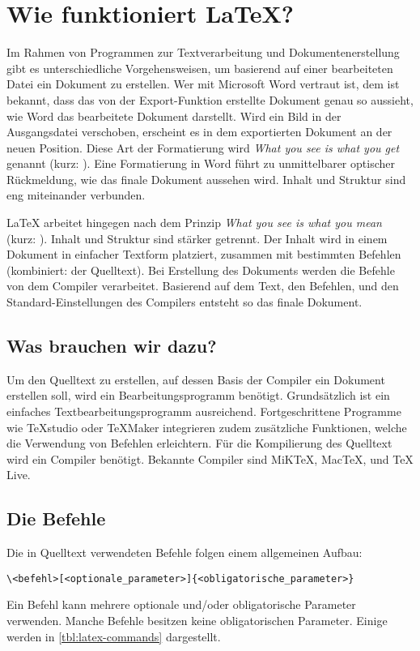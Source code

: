 \section{Wie funktioniert \LaTeX?}
\label{sec:wie_funktioniert_latex_}

Im Rahmen von Programmen zur Textverarbeitung und Dokumentenerstellung gibt es unterschiedliche Vorgehensweisen, um basierend auf einer bearbeiteten Datei ein Dokument zu erstellen. Wer mit Microsoft Word vertraut ist, dem ist bekannt, dass das von der Export-Funktion erstellte Dokument genau so aussieht, wie Word das bearbeitete Dokument darstellt. Wird ein Bild in der Ausgangsdatei verschoben, erscheint es in dem exportierten Dokument an der neuen Position. Diese Art der Formatierung wird \emph{What you see is what you get} genannt (kurz: ). Eine Formatierung in Word führt zu unmittelbarer optischer Rückmeldung, wie das finale Dokument aussehen wird. Inhalt und Struktur sind eng miteinander verbunden.

\LaTeX{} arbeitet hingegen nach dem Prinzip \emph{What you see is what you mean} (kurz: ). Inhalt und Struktur sind stärker getrennt. Der Inhalt wird in einem Dokument in einfacher Textform platziert, zusammen mit bestimmten Befehlen (kombiniert: der Quelltext). Bei Erstellung des Dokuments werden die Befehle von dem Compiler verarbeitet. Basierend auf dem Text, den Befehlen, und den Standard-Einstellungen des Compilers entsteht so das finale Dokument. 

\subsection{Was brauchen wir dazu?}
\label{sub:was_brauchen_wir_dazu}
Um den Quelltext zu erstellen, auf dessen Basis der Compiler ein Dokument erstellen soll, wird ein Bearbeitungsprogramm benötigt. Grundsätzlich ist ein einfaches Textbearbeitungsprogramm ausreichend. Fortgeschrittene Programme wie TeXstudio oder TeXMaker integrieren zudem zusätzliche Funktionen, welche die Verwendung von Befehlen erleichtern.
Für die Kompilierung des Quelltext wird ein Compiler benötigt. Bekannte Compiler sind MiK\TeX, Mac\TeX, und \TeX{} Live.

\subsection{Die Befehle}
\label{sub:die_befehle}
Die in Quelltext verwendeten Befehle folgen einem allgemeinen Aufbau:
\begin{verbatim}
\<befehl>[<optionale_parameter>]{<obligatorische_parameter>}
\end{verbatim}
Ein Befehl kann mehrere optionale und/oder obligatorische Parameter verwenden. Manche Befehle besitzen keine obligatorischen Parameter. Einige werden in \cref{tbl:latex-commands} dargestellt.

